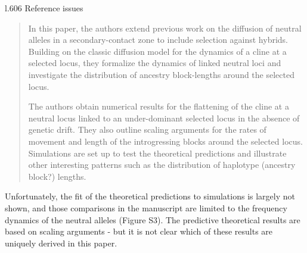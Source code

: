 \begin{point}{l.606}
Reference issues
\end{point}

\reply
{}



% 
% 
% 
% 



\begin{quote}
    In this paper, the authors extend previous work on the diffusion of neutral alleles in a secondary-contact zone to include selection against hybrids. Building on the classic diffusion model for the dynamics of a cline at a selected locus, they formalize the dynamics of linked neutral loci and investigate the distribution of ancestry block-lengths around the selected locus.

    The authors obtain numerical results for the flattening of the cline at a neutral locus linked to an under-dominant selected locus in the absence of genetic drift. They also outline scaling arguments for the rates of movement and length of the introgressing blocks around the selected locus. Simulations are set up to test the theoretical predictions and illustrate other interesting patterns such as the distribution of haplotype (ancestry block?) lengths.
\end{quote}

\begin{point}{}
    Unfortunately, the fit of the theoretical predictions to simulations is largely not shown, and those comparisons in the manuscript are limited to the frequency dynamics of the neutral alleles (Figure S3). The predictive theoretical results are based on scaling arguments - but it is not clear which of these results are uniquely derived in this paper.
\end{point}

